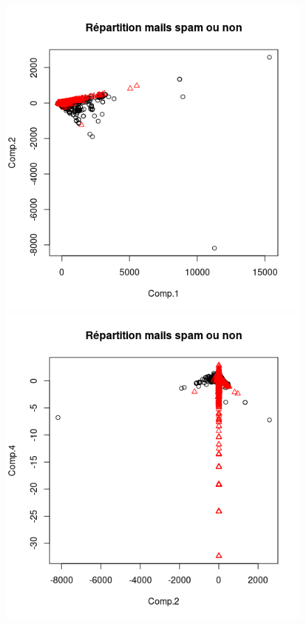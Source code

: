 \documentclass[a4paper, titlepage]{report}
\begin{document}
\begin{figure}[h]
	\begin{center}
		\includegraphics[scale = 0.30]{./doc/plot-c12-vrai-spam.png}
		\includegraphics[scale = 0.30]{./doc/plot-c24-vrai-spam.png}
	\end{center}
\end{figure}
\end{document}
